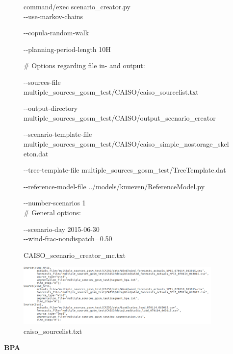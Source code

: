 \begin{figure}[H]
	\begin{framed}
		command/exec scenario\_creator.py\\
		
		-{}-use-markov-chains
		
		-{}-copula-random-walk
		
		-{}-planning-period-length 10H
		
		
		\# Options regarding file in- and output:
		
		-{}-sources-file multiple\_sources\_gosm\_test/CAISO/caiso\_sourcelist.txt
		
		-{}-output-directory multiple\_sources\_gosm\_test/CAISO/output\_scenario\_creator
		
		-{}-scenario-template-file multiple\_sources\_gosm\_test/CAISO/caiso\_simple\_nostorage\_skeleton.dat
		
		-{}-tree-template-file multiple\_sources\_gosm\_test/TreeTemplate.dat
		
		-{}-reference-model-file ../models/knueven/ReferenceModel.py
		
		-{}-number-scenarios 1\\
		
		\# General options:
		
		-{}-scenario-day 2015-06-30\\
		
		-{}-wind-frac-nondispatch=0.50
	\end{framed}
	\caption{CAISO\_scenario\_creator\_mc.txt}
\end{figure}

\begin{figure}[H]
	\centering
	\begin{framed}
		\includegraphics[width=0.9\textwidth]{caiso_sourcelist.png}
	\end{framed}
	\caption{caiso\_sourcelist.txt}
\end{figure}

\textbf{BPA}\\

